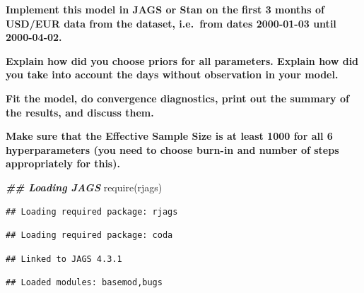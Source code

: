 \documentclass[
]{article}
\newenvironment{Shaded}{\begin{snugshade}}{\end{snugshade}}
\newcommand{\DocumentationTok}[1]{\textcolor[rgb]{0.56,0.35,0.01}{\textbf{\textit{#1}}}}
\newcommand{\FunctionTok}[1]{\textcolor[rgb]{0.00,0.00,0.00}{#1}}
\newcommand{\NormalTok}[1]{#1}
\begin{document}
\textbf{Implement this model in JAGS or Stan on the first 3 months of
USD/EUR data from the dataset, i.e.~from dates 2000-01-03 until
2000-04-02.}

\textbf{Explain how did you choose priors for all parameters. Explain
how did you take into account the days without observation in your
model.}

\textbf{Fit the model, do convergence diagnostics, print out the summary
of the results, and discuss them.}

\textbf{Make sure that the Effective Sample Size is at least 1000 for
all 6 hyperparameters (you need to choose burn-in and number of steps
appropriately for this).}

\begin{Shaded}
\begin{Highlighting}[]
\DocumentationTok{\#\# Loading JAGS}
\FunctionTok{require}\NormalTok{(rjags)}
\end{Highlighting}
\end{Shaded}

\begin{verbatim}
## Loading required package: rjags
\end{verbatim}

\begin{verbatim}
## Loading required package: coda
\end{verbatim}

\begin{verbatim}
## Linked to JAGS 4.3.1
\end{verbatim}

\begin{verbatim}
## Loaded modules: basemod,bugs
\end{verbatim}
\end{document}
